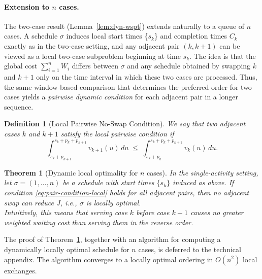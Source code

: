 \documentclass[letterpaper]{article}
\newtheorem{theorem}{Theorem}
\newtheorem{definition}{Definition}
\newif\ifconf
\begin{document}
\paragraph{Extension to $n$ cases.}
The two-case result (Lemma~\ref{lem:dyn-wspt}) extends naturally to
a queue of $n$ cases.  A schedule $\sigma$ induces local start times
\{$s_k$\} and completion times $C_k$ exactly as in the two-case setting,
and any adjacent pair $(k,k{+}1)$ can be viewed as a local two-case
subproblem beginning at time $s_k$.  The idea is that the global
cost $\sum_{i=1}^{n} W_i$ differs between $\sigma$ and any schedule obtained by swapping
$k$ and $k{+}1$ only on the time interval in which these two cases are
processed.  Thus, the same window-based comparison that determines the
preferred order for two cases yields a \emph{pairwise dynamic
condition} for each adjacent pair in a longer sequence.


\begin{definition}[Local Pairwise No-Swap Condition]
\label{def:pair-condition-local}
We say that two adjacent cases $k$ and $k+1$ satisfy the
\emph{local pairwise condition} if
\begin{equation}
\label{eq:pair-condition-local}
\int_{s_k+p_{k+1}}^{s_k+p_k+p_{k+1}} v_{k+1}(u)\,du
\;\le\;
\int_{s_k+p_k}^{s_k+p_k+p_{k+1}} v_k(u)\,du.
\end{equation}
\end{definition}

\begin{theorem}[Dynamic local optimality for $n$ cases]
\label{thm:ncase-local}
In the single-activity setting, let $\sigma=(1,\ldots,n)$ be a schedule
with start times $\{s_k\}$ induced as above. 
If condition \eqref{eq:pair-condition-local} holds for all adjacent pairs, then no adjacent swap
can reduce $J$, i.e., $\sigma$ is locally optimal.\\
Intuitively, this means that serving case $k$ before case ${k+1}$ causes no greater
weighted waiting cost than serving them in the reverse order. 
\end{theorem}

\ifconf
   The proof of Theorem~\ref{thm:ncase-local}, together with an algorithm for computing a dynamically locally optimal schedule for $n$ cases, is deferred to the technical appendix. The algorithm converges to a locally optimal ordering in $O(n^2)$ local exchanges.
\end{document}
